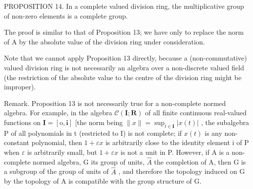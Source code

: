 PROPOSITION 14. In a complete valued division ring, the multiplicative group of non-zero elements is a complete group.

The proof is similar to that of Proposition 13; we have only to replace the norm of A by the absolute value of the division ring under consideration.

Note that we cannot apply Proposition 13 directly, because a (non-commutative) valued division ring is not necessarily an algebra over a non-discrete valued field (the restriction of the absolute value to the centre of the division ring might be improper).

Remark. Proposition 13 is not necessarily true for a non-complete normed algebra. For example, in the algebra \(\mathcal{C}(\mathbf{I};\mathbf{R})\) of all finite continuous real-valued functions on \(\mathbf{I} = [\mathrm{o},\mathbf{i}]\) {[}the norm being \(\| x\| = \sup_{t\in \mathbf{I}}|x(t)|\) , the subalgebra P of all polynomials in t (restricted to I) is not complete; if \(x(t)\) is any non-constant polynomial, then \(1 + \varepsilon x\) is arbitrarily close to the identity element i of P when \(\varepsilon\) is arbitrarily small, but \(1 + \varepsilon x\) is not a unit in P. However, if A is a non-complete normed algebra, G its group of units, \(\hat{A}\) the completion of A, then G is a subgroup of the group of units of \(\hat{A}\) , and therefore the topology induced on G by the topology of A is compatible with the group structure of G.

